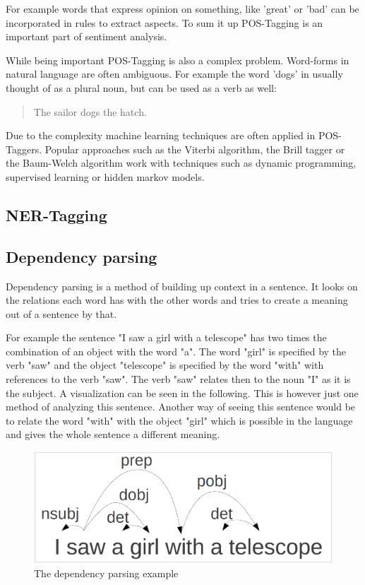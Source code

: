 \documentclass[10pt,a4paper]{article}
\begin{document}
		For example words that express opinion on something, like 'great' or 'bad' can be incorporated in rules to extract aspects. To sum it up POS-Tagging is an important part of sentiment analysis.
		
		While being important POS-Tagging is also a complex problem. Word-forms in natural language are often ambiguous. For example the word 'dogs' in usually thought of as a plural noun, but can be used as a verb as well:

		\begin{quote}
			The sailor dogs the hatch.
		\end{quote}

		Due to the complexity machine learning techniques are often applied in POS-Taggers. Popular approaches such as the Viterbi algorithm, the Brill tagger or the Baum-Welch algorithm work with techniques such as dynamic programming, supervised learning or hidden markov models.
		
		\subsection{NER-Tagging}
		
		\subsection{Dependency parsing}
		
		Dependency parsing is a method of building up context in a sentence.
		It looks on the relations each word has with the other words and tries to create a meaning out of a sentence by that.
		
		For example the sentence "I saw a girl with a telescope" has two times the combination of an object with the word "a". 
		The word "girl" is specified by the verb "saw" and the object "telescope" is specified by the word "with" with references to the verb "saw". 
		The verb "saw" relates then to the noun "I" as it is the subject. 		
		A visualization can be seen in the following.
		This is however just one method of analyzing this sentence.
		Another way of seeing this sentence would be to relate the word "with" with the object "girl" which is possible in the language and gives the whole sentence a different meaning.
		
		\begin{figure}[h]
			\includegraphics[width=\linewidth]{data/dependency}
			\caption{The dependency parsing example}
			\label{fig:dependency}
		\end{figure}
		
\end{document}
